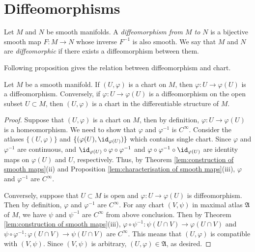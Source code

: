 \section{Diffeomorphisms}

\begin{definition}[Diffeomorphism]
    Let $M$ and $N$ be smooth manifolds. A \emph{diffeomorphism from $M$ to $N$} is a bijective smooth map $F : M \to N$ whose inverse $F^{-1}$ is also smooth. We say that $M$ and $N$ are \emph{diffeomorphic} if there exists a diffeomorphism between them.
\end{definition}

Following proposition gives the relation between diffeomorphism and chart.

\begin{proposition}\label{lem:chart map is diffeomorphism}
    Let $M$ be a smooth manifold. If $(U, \varphi)$ is a chart on $M$, then $\varphi : U \to \varphi(U)$ is a diffeomorphism. Conversely, if $\varphi : U \to \varphi(U)$ is a diffeomorphism on the open subset $U \subset M$, then $(U, \varphi)$ is a chart in the differentiable structure of $M$.
\end{proposition}

\begin{proof}
    Suppose that $(U, \varphi)$ is a chart on $M$, then by definition, $\varphi : U \to \varphi(U)$ is a homeomorphism. We need to show that $\varphi$ and $\varphi^{-1}$ is $C^\infty$. Consider the atlases $\{(U, \varphi)\}$ and $\{(\varphi(U), \id_{\varphi(U)})\}$ which contains single chart. Since $\varphi$ and $\varphi^{-1}$ are continuous, and $\id_{\varphi(U)} \circ \varphi \circ \varphi^{-1}$ and $\varphi \circ \varphi^{-1} \circ \id_{\varphi(U)}$ are identity maps on $\varphi(U)$ and $U$, respectively. Thus, by Theorem \ref{lem:construction of smooth maps}(ii) and Proposition \ref{lem:characterisation of smooth maps}(iii), $\varphi$ and $\varphi^{-1}$ are $C^\infty$.

    Conversely, suppose that $U \subset M$ is open and $\varphi : U \to \varphi(U)$ is diffeomorphism. Then by definition, $\varphi$ and $\varphi^{-1}$ are $C^\infty$. For any chart $(V, \psi)$ in maximal atlas $\mathfrak{A}$ of $M$, we have $\psi$ and $\psi^{-1}$ are $C^\infty$ from above conclusion. Then by Theorem \ref{lem:construction of smooth maps}(iii), $\varphi \circ \psi^{-1} : \psi(U \cap V) \to \varphi(U \cap V)$ and $\psi \circ \varphi^{-1} : \varphi(U \cap V) \to \psi(U \cap V)$ are $C^\infty$. This means that $(U, \varphi)$ is compatible with $(V, \psi)$. Since $(V, \psi)$ is arbitrary, $(U, \varphi) \in \mathfrak{A}$, as desired.
\end{proof}
